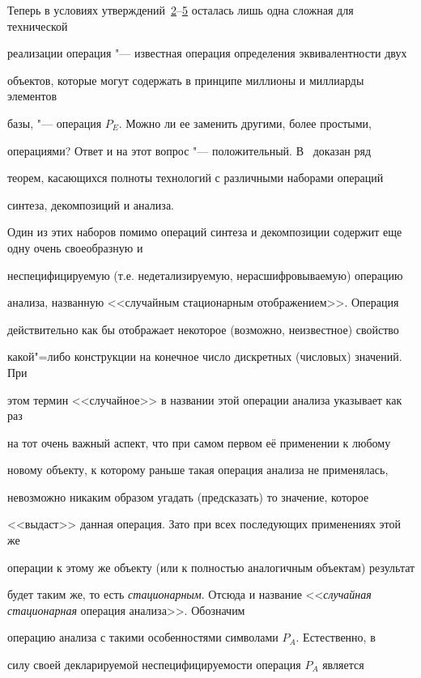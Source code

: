 \smallskip





Теперь в условиях утверждений~\hyperlink{kr:utv2}{2}--\hyperlink{kr:utv5}{5} осталась лишь одна сложная для технической

реализации операция "--- известная операция определения эквивалентности двух

объектов, которые могут содержать в принципе миллионы и миллиарды элементов

базы, "--- операция $P_{E}$. Можно ли ее заменить другими, более простыми,

операциями? Ответ и на этот вопрос "--- положительный. В~\cite{krylov:bib3,krylov:bib6} доказан ряд

теорем, касающихся полноты технологий с различными наборами операций

синтеза, декомпозиций и анализа. 

Один из этих наборов помимо операций синтеза и декомпозиции содержит еще одну очень своеобразную и

неспецифицируемую (т.е. недетализируемую, нерасшифровываемую) операцию

анализа, названную <<случайным стационарным отображением>>. Операция

действительно как бы отображает некоторое (возможно, неизвестное) свойство

какой"=либо конструкции на конечное число дискретных (числовых) значений. При

этом термин <<случайное>> в названии этой операции анализа указывает как раз

на тот очень важный аспект, что при самом первом её применении к любому

новому объекту, к которому раньше такая операция анализа не применялась,

невозможно никаким образом угадать (предсказать) то значение, которое

<<выдаст>> данная операция. Зато при всех последующих применениях этой же

операции к этому же объекту (или к полностью аналогичным объектам) результат

будет таким же, то есть {\sl стационарным}. Отсюда и название <<{\sl случайная стационарная} операция анализа>>. Обозначим

операцию анализа с такими особенностями символами $P_{A}$. Естественно, в

силу своей декларируемой неспецифицируемости операция $P_{A}$ является

